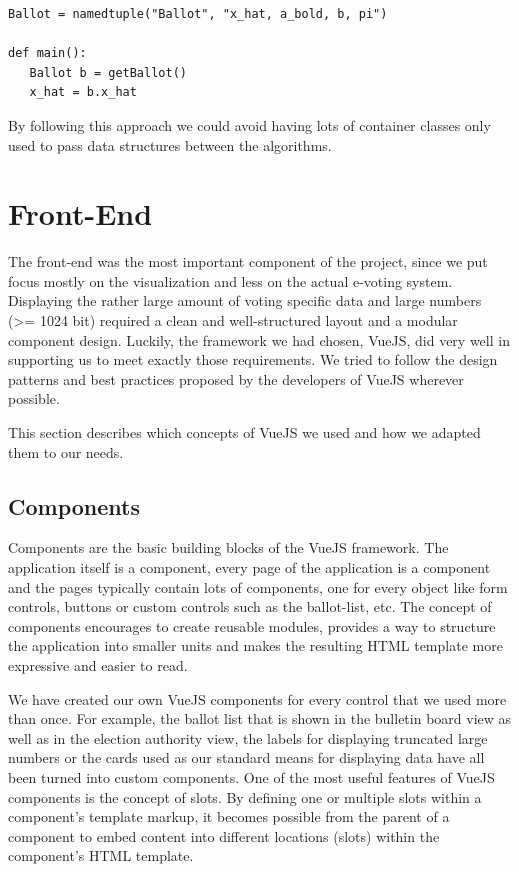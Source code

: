 \begin{verbatim}
Ballot = namedtuple("Ballot", "x_hat, a_bold, b, pi")

def main():
   Ballot b = getBallot()
   x_hat = b.x_hat
\end{verbatim}

By following this approach we could avoid having lots of container classes only used to pass data structures between the algorithms.

\section{Front-End}
The front-end was the most important component of the project, since we put focus mostly on the visualization and less on the actual e-voting system. Displaying the rather large amount of voting specific data and large numbers (>= 1024 bit) required a clean and well-structured layout and a modular component design. Luckily, the framework we had chosen, VueJS, did very well in supporting us to meet exactly those requirements. We tried to follow the design patterns and best practices proposed by the developers of VueJS wherever possible.

This section describes which concepts of VueJS we used and how we adapted them to our needs.

\subsection{Components}
Components are the basic building blocks of the VueJS framework. The application itself is a component, every page of the application is a component and the pages typically contain lots of components, one for every object like form controls, buttons or custom controls such as the ballot-list, etc. The concept of components encourages to create reusable modules, provides a way to structure the application into smaller units and makes the resulting HTML template more expressive and easier to read.

We have created our own VueJS components for every control that we used more than once. For example, the ballot list that is shown in the bulletin board view as well as in the election authority view, the labels for displaying truncated large numbers or the cards used as our standard means for displaying data have all been turned into custom components. One of the most useful features of VueJS components is the concept of slots. By defining one or multiple slots within a component's template markup, it becomes possible from the parent of a component to embed content into different locations (slots) within the component's HTML template.

